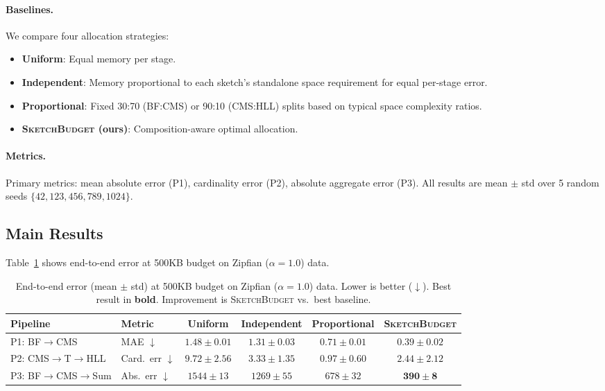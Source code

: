 \documentclass[preprint]{article}
\newcommand{\SketchBudget}{\textsc{SketchBudget}}
\begin{document}
\paragraph{Baselines.}
We compare four allocation strategies:
\begin{itemize}
    \item \textbf{Uniform}: Equal memory per stage.
    \item \textbf{Independent}: Memory proportional to each sketch's standalone space requirement for equal per-stage error.
    \item \textbf{Proportional}: Fixed 30:70 (BF:CMS) or 90:10 (CMS:HLL) splits based on typical space complexity ratios.
    \item \textbf{\SketchBudget{} (ours)}: Composition-aware optimal allocation.
\end{itemize}

\paragraph{Metrics.}
Primary metrics: mean absolute error (P1), cardinality error (P2), absolute aggregate error (P3). All results are mean $\pm$ std over 5 random seeds $\{42, 123, 456, 789, 1024\}$.

\subsection{Main Results}

Table~\ref{tab:main_results} shows end-to-end error at 500KB budget on Zipfian ($\alpha=1.0$) data.

\begin{table}[t]
\centering
\caption{End-to-end error (mean $\pm$ std) at 500KB budget on Zipfian ($\alpha=1.0$) data. Lower is better ($\downarrow$). Best result in \textbf{bold}. Improvement is \SketchBudget{} vs.\ best baseline.}
\label{tab:main_results}
\begin{tabular}{llcccc}
\toprule
Pipeline & Metric & Uniform & Independent & Proportional & \SketchBudget{} \\
\midrule
P1: BF$\to$CMS & MAE $\downarrow$ & $1.48 \pm 0.01$ & $1.31 \pm 0.03$ & $0.71 \pm 0.01$ & $\mathbf{0.39 \pm 0.02}$ \\
P2: CMS$\to$T$\to$HLL & Card.\ err $\downarrow$ & $9.72 \pm 2.56$ & $3.33 \pm 1.35$ & $\mathbf{0.97 \pm 0.60}$ & $2.44 \pm 2.12$ \\
P3: BF$\to$CMS$\to$Sum & Abs.\ err $\downarrow$ & $1544 \pm 13$ & $1269 \pm 55$ & $678 \pm 32$ & $\mathbf{390 \pm 8}$ \\
\bottomrule
\end{tabular}
\end{table}
\end{document}
